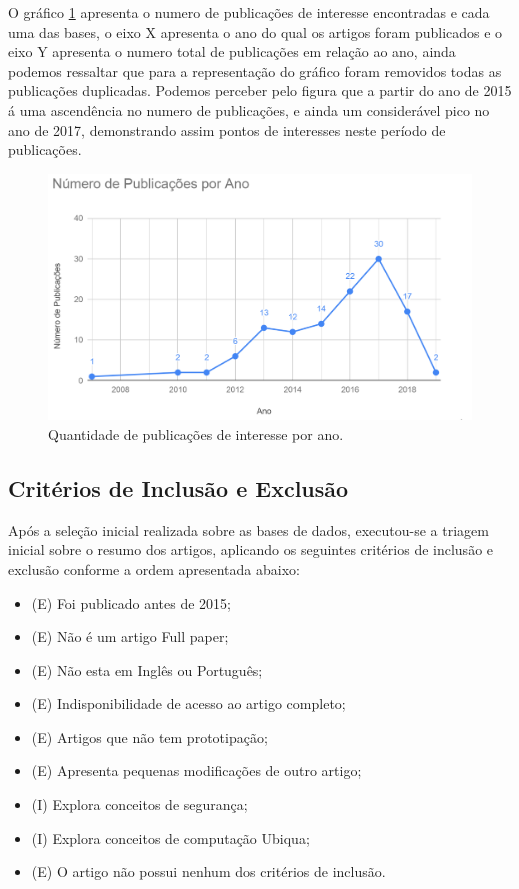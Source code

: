 \documentclass[tid,table]{texufpel} %
\begin{document}
O gráfico \ref{fig:grafPublicaAno} apresenta o numero de publicações de interesse encontradas e cada uma das bases, o eixo X apresenta o ano do qual os artigos foram publicados e o eixo Y apresenta o numero total de publicações em relação ao ano, ainda podemos ressaltar que para a representação do gráfico foram removidos todas as publicações duplicadas. Podemos perceber pelo figura que a partir do ano de 2015 á uma ascendência no numero de publicações, e ainda um considerável pico no ano de 2017, demonstrando assim pontos de interesses neste período de publicações.

\begin{figure}[ht]
	\centering
	\includegraphics[width=.9\textwidth]{imagens/grafPublicaAno.png}
	\caption{Quantidade de publicações de interesse por ano.}
	\label{fig:grafPublicaAno}
\end{figure}

\subsection{Critérios de Inclusão e Exclusão}
Após a seleção inicial realizada sobre as bases de dados, executou-se a triagem inicial sobre o resumo dos artigos, aplicando os seguintes critérios de inclusão e exclusão conforme a ordem apresentada abaixo: 
\begin{itemize}
	\item (E) Foi publicado antes de 2015;
	\item (E) Não é um artigo Full paper;
	\item (E) Não esta em Inglês ou Português;
	\item (E) Indisponibilidade de acesso ao artigo completo;
	\item (E) Artigos que não tem prototipação;
	\item (E) Apresenta pequenas modificações de outro artigo;
	\item (I) Explora conceitos de segurança;
	\item (I) Explora conceitos de computação Ubiqua;
	\item (E) O artigo não possui nenhum dos critérios de inclusão.
\end{itemize}
	
\end{document}
